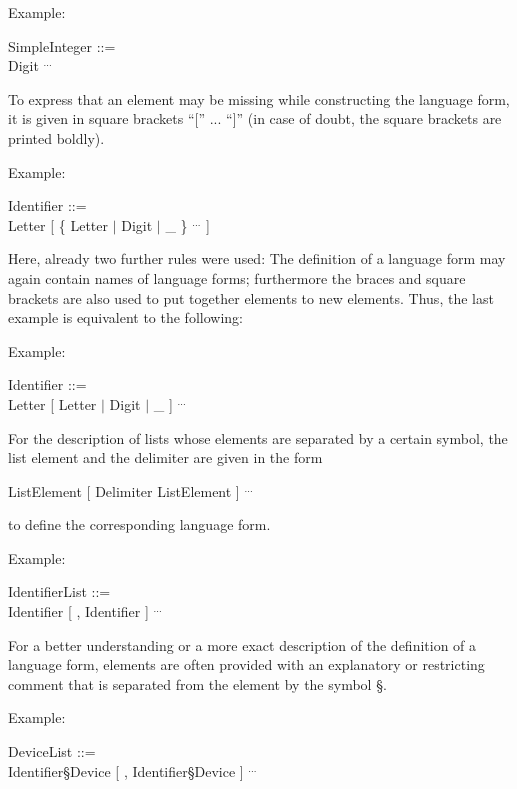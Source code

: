 Example:

SimpleInteger ::=\\
\x Digit $^{...}$

To express that an element may be missing while constructing the
language form, it is given in square brackets ``['' ... ``]'' (in case
of doubt, the square brackets are printed boldly).

Example:

Identifier ::=\\
\x Letter [ \{ Letter $\mid$ Digit $\mid$ \_ \} $^{...}$ ]

Here, already two further rules were used: The definition of a language
form may again contain names of language forms; furthermore the braces
and square brackets are also used to put together elements to new
elements. Thus, the last example is equivalent to the following:

Example:

Identifier ::=\\
\x Letter [ Letter $\mid$ Digit $\mid$ \_ ] $^{...}$

For the description of lists whose elements are separated by a certain
symbol, the list element and the delimiter are given in the form

ListElement [ Delimiter ListElement ] $^{...}$

to define the corresponding language form.

Example:

IdentifierList ::=\\
\x Identifier [ , Identifier ] $^{...}$

For a better understanding or a more exact description of the definition
of a language form, elements are often provided with an explanatory or
restricting comment that is separated from the element by the symbol
\S .

Example:

DeviceList ::=\\
\x Identifier\S  Device [ , Identifier\S Device ] $^{...}$

